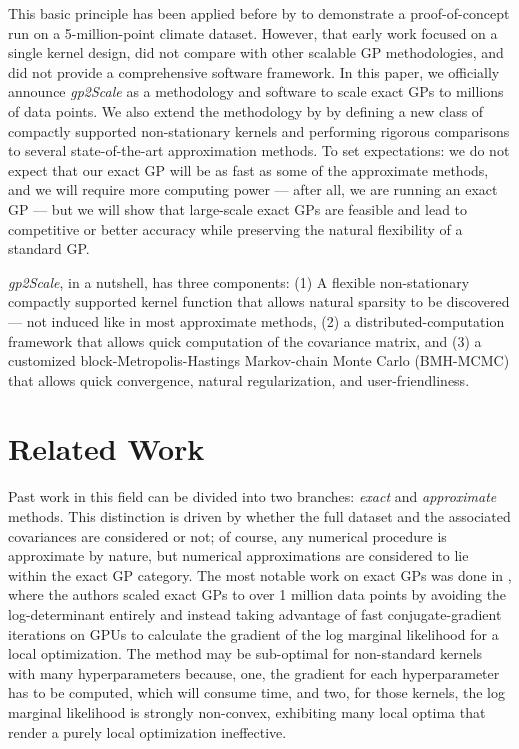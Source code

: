 \documentclass{article}
\begin{document}
This basic principle has been applied before by \cite{noack2023exact} to demonstrate a proof-of-concept run on a 5-million-point climate dataset. However, that early work focused on a single kernel design, did not compare with other scalable GP methodologies, and did not provide a comprehensive software framework. In this paper, we officially announce \emph{gp2Scale} as a methodology and software to scale exact GPs to millions of data points. We also extend the methodology by \cite{noack2023exact} by defining a new class of compactly supported non-stationary kernels and performing rigorous comparisons to several state-of-the-art approximation methods. To set expectations: we do not expect that our exact GP will be as fast as some of the approximate methods, and we will require more computing power --- after all, we are running an exact GP --- but we will show that large-scale exact GPs are feasible and lead to competitive or better accuracy while preserving the natural flexibility of a standard GP.


\emph{gp2Scale}, in a nutshell, has three components: (1) A flexible non-stationary compactly supported kernel function that allows natural sparsity to be discovered --- not induced like in most approximate methods, (2) a distributed-computation framework that allows quick computation of the covariance matrix, and (3) a customized block-Metropolis-Hastings Markov-chain Monte Carlo (BMH-MCMC) that allows quick convergence, natural regularization, and user-friendliness.


\section{Related Work}
Past work in this field can be divided into two branches: \emph{exact} and \emph{approximate} methods. This distinction is driven by whether the full dataset and the associated covariances are considered or not; of course, any numerical procedure is approximate by nature, but numerical approximations are considered to lie within the exact GP category. The most notable work on exact GPs was done in \citep{wang2019exact}, where the authors scaled exact GPs to over 1 million data points by avoiding the log-determinant entirely and instead taking advantage of fast conjugate-gradient iterations on GPUs to calculate the gradient of the log marginal likelihood for a local optimization. The method may be sub-optimal for non-standard kernels with many hyperparameters because, one, the gradient for each hyperparameter has to be computed, which will consume time, and two, for those kernels, the log marginal likelihood is strongly non-convex, exhibiting many local optima that render a purely local optimization ineffective. 
\end{document}
